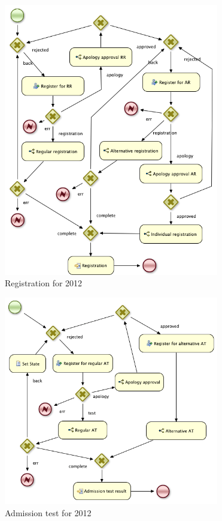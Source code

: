 	\begin{figure}[h]
		\label{fig:bpm:2012_registration_E}
		\centering
		\includegraphics[width=9.4cm]{figures/bpm/2012_registration_E}
		\caption{Registration for 2012}
	\end{figure}

	\begin{figure}[h]
		\label{fig:bpm:2012_admission_test_E}
		\centering
		\includegraphics[width=9.4cm]{figures/bpm/2012_admission_test_E}
		\caption{Admission test for 2012}
	\end{figure}

